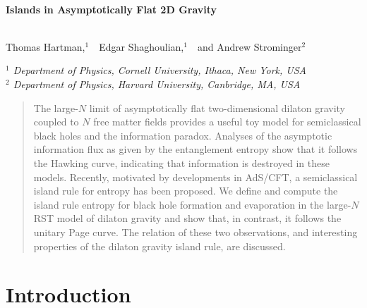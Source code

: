 \documentclass[11pt,oneside,letterpaper]{article}
\numberwithin{equation}{section}
\begin{document}
\onehalfspacing

\begin{center}

~
\vskip3cm

{\LARGE \bf { Islands in Asymptotically Flat 2D  Gravity
\\
\ \\
}}

\vskip10mm

Thomas Hartman,$^{1}$\ \ Edgar Shaghoulian,$^{1}$\ \  and Andrew Strominger$^{2}$

\vskip5mm

{\it $^1$ Department of Physics, Cornell University, Ithaca, New York, USA
}  \\
{\it $^2$ Department of Physics, Harvard University, Canbridge, MA, USA } 
\vskip5mm


\vskip5mm





\end{center}

\vspace{4mm}
\begin{abstract}
\noindent
The large-$N$ limit of asymptotically flat two-dimensional dilaton gravity coupled to $N$ free matter 
fields provides a useful toy model for semiclassical black holes and the information paradox. Analyses of the asymptotic information 
flux as given by the entanglement entropy  show that it follows the Hawking curve, indicating that information is destroyed in these models. Recently, motivated by developments in AdS/CFT, a semiclassical  island rule for entropy has been
proposed. We define and compute the island rule entropy for black hole formation and evaporation in the large-$N$  RST model of dilaton gravity and show that, in 
contrast, it follows the unitary Page curve. The relation of these two observations, and interesting properties of the dilaton gravity island rule, are discussed. 
 
 \end{abstract}


\pagebreak
\pagestyle{plain}

\setcounter{tocdepth}{2}
{}
\vfill
\tableofcontents



\section{Introduction}
\end{document}
